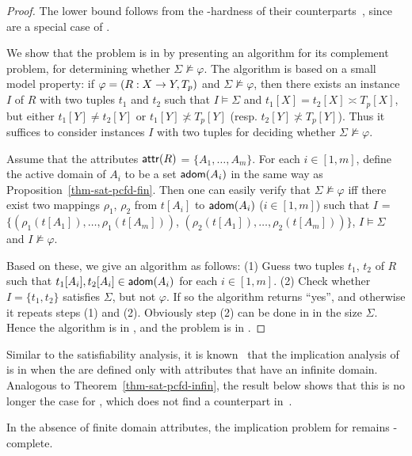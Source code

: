 \begin{proof}
The lower bound follows from the \coNP-hardness of their \CFDs
counterparts~\cite{CFDs}, since \CFDs are a special case of \pCFDs.

We show that the problem is in \coNP by presenting an \NP algorithm
for its complement problem, \ie for determining whether
$\Sigma\not\models\varphi$. The algorithm is based on a small model
property: if $\varphi = (R: X \rightarrow Y, T_p)$ and $\Sigma
\not\models\varphi$, then there exists an instance $I$ of $R$ with
two tuples $t_1$ and $t_2$ such that $I\models\Sigma$ and $t_1[X] =
t_2[X] \asymp T_p[X]$, but either $t_1[Y]\ne t_2[Y]$ or
$t_1[Y]\not\asymp T_p[Y]$ (resp. $t_2[Y]\not\asymp T_p[Y]$). Thus it
suffices to consider instances $I$ with two tuples for deciding
whether $\Sigma\not\models\varphi$.

Assume \kwlog that the attributes $\protect\mathsf{attr}(R)$ = $\{A_1,\dots,
A_m\}$. For each $i\in [1, m]$, define the active domain of $A_i$ to
be a set ${\mathsf{adom}}(A_i)$ in the same way as
Proposition~\ref{thm-sat-pcfd-fin}. Then one can easily verify that
$\Sigma\not\models\varphi$ iff there exist two mappings $\rho_1$,
$\rho_2$ from $t[A_i]$ to ${\mathsf{adom}}(A_i)$ ($i\in [1, m]$) such that $I$
= $\{(\rho_1(t[A_1]), \ldots, \rho_1(t[A_m]))$, $(\rho_2(t[A_1]),
\ldots, \rho_2(t[A_m]))\}$, $I \models\Sigma$ and
$I\not\models\varphi$.

Based on these, we give an \NP algorithm as follows: (1) Guess two
tuples $t_1$, $t_2$ of $R$ such that $t_1[A_i],t_2[A_i]
\in{\ensuremath {\mathsf{adom}}}(A_i)$ for each $i \in [1, m]$. (2) Check whether $I =
\{t_1, t_2\}$ satisfies $\Sigma$, but not $\varphi$. If so the
algorithm returns ``yes'', and otherwise it repeats steps (1) and
(2). Obviously step (2) can be done in \PTIME in the size $\Sigma$.
Hence the algorithm is in \NP, and the problem is in \coNP.
\end{proof}

Similar to the satisfiability analysis,
it is known~\cite{CFDs} that the implication analysis of
\CFDs is in \PTIME when the \CFDs are defined only with attributes that
have an infinite domain. Analogous to Theorem~\ref{thm-sat-pcfd-infin},
the result below shows that this is no longer the case for \pCFDs,
which does not find a counterpart in~\cite{CFDs}.

\begin{theorem}
\label{thm-imp-pcfd-infin} In the absence of finite domain
attributes, the implication problem for \pCFDs remains
\coNP-complete. \eop
\end{theorem}
\vspace{-1ex}

